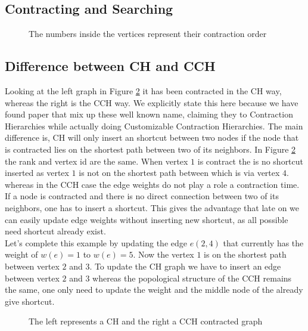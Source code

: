 \subsection{Contracting and Searching}

\begin{figure}
    \centering
    
    \caption{The numbers inside the vertices represent their contraction order}
    \label{fig:contrating_and_searching}
\end{figure}

\subsection{Difference between CH and CCH}

Looking at the left graph in Figure \ref*{fig:DifferenceCHAndCCH} it has been contracted in the CH way, whereas the right is the CCH way. We explicitly state this here because 
we have found paper \cite{Ouyang_2020} that mix up these well known name, claiming they to Contraction Hierarchies while actually doing Customizable Contraction Hierarchies. 
The main difference is, CH will only insert an shortcut between two nodes if the node that is contracted lies on the shortest path between two of its neighbors. In Figure \ref*{fig:DifferenceCHAndCCH} 
the rank and vertex id are the same. When vertex $1$ is contract the is no shortcut inserted as vertex $1$ is not on the shortest path between which is via vertex $4$.
\\
whereas in the CCH case the edge weights do not play a role a contraction time. If a node is contracted and there is no direct connection between two of its neighbors, one has to insert a shortcut. This gives
the advantage that late on we can easily update edge weights without inserting new shortcut, as all possible need shortcut already exist.
\\ 
Let's complete this example by updating the edge $e(2, 4)$ that currently has the weight of $w(e)=1$ to $w(e) = 5$. Now the vertex $1$ is on the shortest path between vertex $2$ and $3$. 
To update the CH graph we have to insert an edge between vertex $2$ and $3$ whereas the popological structure of the CCH remains the same, one only need to update the weight and the middle node of the already give shortcut.

\begin{figure}
    \centering
    
    \caption{The left represents a CH and the right a CCH contracted graph}
    \label{fig:DifferenceCHAndCCH}
\end{figure}

